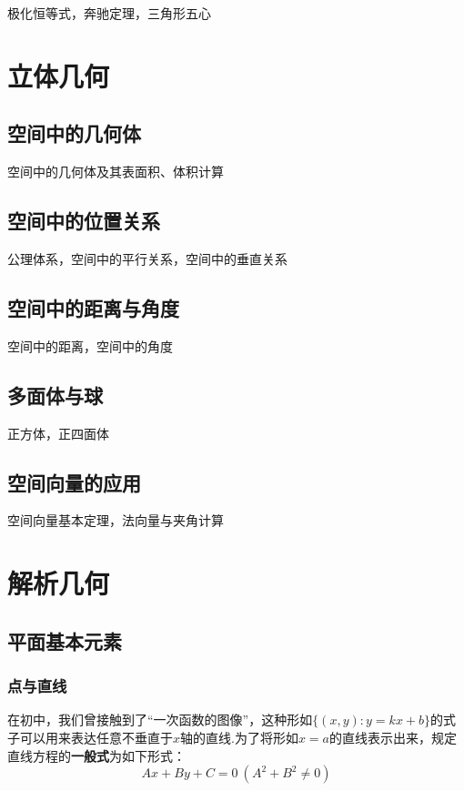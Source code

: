 \documentclass[lang=cn, zihao=4.5]{elegantbook}
\begin{document}
极化恒等式，奔驰定理，三角形五心

\chapter{立体几何}

\section{空间中的几何体}

空间中的几何体及其表面积、体积计算

\section{空间中的位置关系}

公理体系，空间中的平行关系，空间中的垂直关系

\section{空间中的距离与角度}

空间中的距离，空间中的角度

\section{多面体与球}

正方体，正四面体

\section{空间向量的应用}

空间向量基本定理，法向量与夹角计算

\chapter{解析几何}

\section{平面基本元素}

\subsection{点与直线}

在初中，我们曾接触到了“一次函数的图像”，这种形如$\{ (x,y):y=kx+b \}$的式子可以用来表达任意不垂直于$x$轴的直线.为了将形如$x=a$的直线表示出来，规定直线方程的\textbf{一般式}为如下形式：$$Ax+By+C=0~(A^2+B^2 \neq 0)$$
\end{document}

